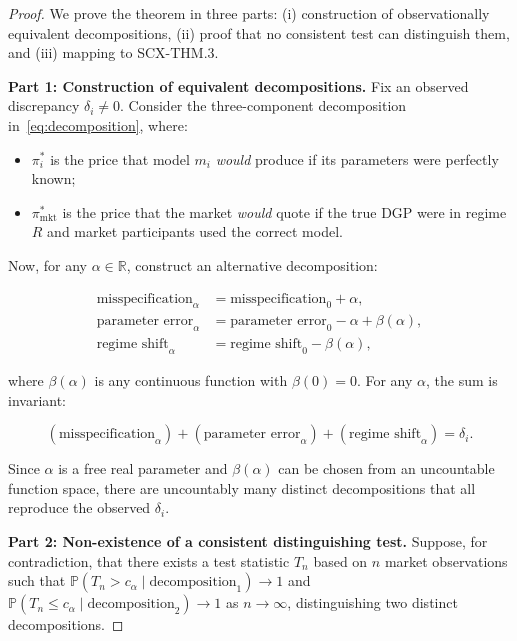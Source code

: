 \documentclass[11pt,a4paper]{article}
\theoremstyle{plain}
\theoremstyle{definition}
\theoremstyle{remark}
\newcommand{\R}{\mathbb{R}}
\newcommand{\Pbb}{\mathbb{P}}
\begin{document}
\begin{proof}
We prove the theorem in three parts: (i) construction of observationally equivalent decompositions, (ii) proof that no consistent test can distinguish them, and (iii) mapping to \textsc{SCX-THM.3}.

\medskip\noindent\textbf{Part 1: Construction of equivalent decompositions.}
Fix an observed discrepancy $\delta_i \neq 0$. Consider the three-component decomposition in~\eqref{eq:decomposition}, where:

\begin{itemize}[nosep]
  \item $\pi_i^*$ is the price that model $m_i$ \emph{would} produce if its parameters were perfectly known;
  \item $\pi_{\text{mkt}}^*$ is the price that the market \emph{would} quote if the true DGP were in regime $R$ and market participants used the correct model.
\end{itemize}

Now, for any $\alpha \in \R$, construct an alternative decomposition:

\begin{align}
  \text{misspecification}_\alpha &= \text{misspecification}_0 + \alpha, \nonumber\\
  \text{parameter error}_\alpha    &= \text{parameter error}_0 - \alpha + \beta(\alpha), \nonumber\\
  \text{regime shift}_\alpha       &= \text{regime shift}_0 - \beta(\alpha),
\end{align}

where $\beta(\alpha)$ is any continuous function with $\beta(0) = 0$. For any $\alpha$, the sum is invariant:

\begin{equation}\label{eq:invariance}
  (\text{misspecification}_\alpha) + (\text{parameter error}_\alpha) + (\text{regime shift}_\alpha) = \delta_i.
\end{equation}

Since $\alpha$ is a free real parameter and $\beta(\alpha)$ can be chosen from an uncountable function space, there are uncountably many distinct decompositions that all reproduce the observed $\delta_i$.

\medskip\noindent\textbf{Part 2: Non-existence of a consistent distinguishing test.}
Suppose, for contradiction, that there exists a test statistic $T_n$ based on $n$ market observations such that $\Pbb(T_n > c_\alpha \mid \text{decomposition}_1) \to 1$ and $\Pbb(T_n \leq c_\alpha \mid \text{decomposition}_2) \to 1$ as $n \to \infty$, distinguishing two distinct decompositions.


\end{proof}
\end{document}

